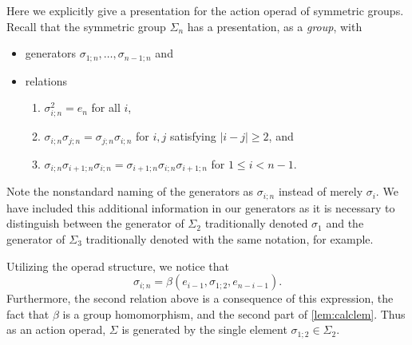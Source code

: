 \begin{example}\label{ex:sigma-pres}
Here we explicitly give a presentation for the action operad of symmetric groups.
Recall that the symmetric group $\Sigma_n$ has a presentation, as a \emph{group}, with
\begin{itemize}
\item generators $\sigma_{1;n}, \ldots, \sigma_{n-1;n}$ and
\item relations
\begin{enumerate}
\item $\sigma_{i;n}^2 = e_n$ for all $i$,
\item $\sigma_{i;n} \sigma_{j;n} = \sigma_{j;n} \sigma_{i;n}$ for $i, j$ satisfying $|i-j| \geq 2$, and
\item $\sigma_{i;n} \sigma_{i+1;n} \sigma_{i;n} = \sigma_{i+1;n} \sigma_{i;n} \sigma_{i+1;n}$ for $1 \leq i < n-1$.
\end{enumerate}
\end{itemize}
Note the nonstandard naming of the generators as $\sigma_{i;n}$ instead of merely $\sigma_i$. 
We have included this additional information in our generators as it is necessary to distinguish between the generator of $\Sigma_2$ traditionally denoted $\sigma_1$ and the generator of $\Sigma_3$ traditionally denoted with the same notation, for example. 

Utilizing the operad structure, we notice that
\[
\sigma_{i;n} = \beta(e_{i-1}, \sigma_{1;2}, e_{n-i-1}).
\]
Furthermore, the second relation above is a consequence of this expression, the fact that $\beta$ is a group homomorphism, and the second part of \cref{lem:calclem}.
Thus as an action operad, $\Sigma$ is generated by the single element $\sigma_{1;2} \in \Sigma_2$.


\end{example}
